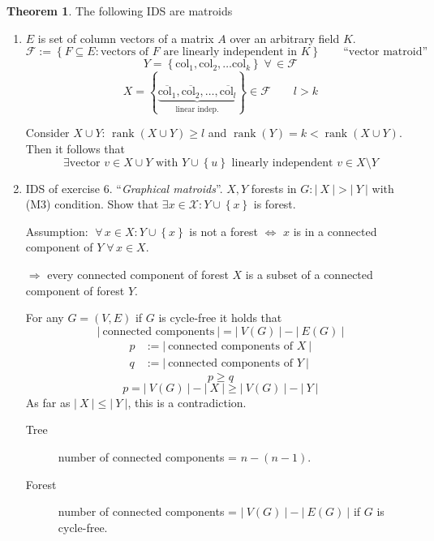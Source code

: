 \documentclass[a4paper]{article}
\theoremstyle{definition}
\newtheorem{theorem}{Theorem}
\newcommand{\card}[1]{\left|\:\!#1\:\!\right|}
\newcommand{\set}[1]{\left\{#1\right\}}
\newcommand{\fall}{\;\forall\,}
\DeclareMathOperator{\rank}{rank}
\begin{document}
\begin{theorem}
  \label{proposition-8.1}
  The following IDS are matroids
  \begin{enumerate}
    \item $E$ is set of column vectors of a matrix $A$ over an arbitrary field $K$.
      \[
        \mathcal{F} := \set{F \subseteq E: \text{vectors of } F \text{ are linearly independent in } K}
            \qquad \text{``vector matroid''}
      \] \[
        Y = \set{\text{col}_1, \text{col}_2, \ldots \text{col}_k} \fall \in \mathcal{F}
      \] \[
        X = \set{
          \underbrace{\overline{\text{col}_1}, \overline{\text{col}_2}, \ldots, \overline{\text{col}_l}}_{\text{linear indep.}}
        } \in \mathcal{F} \qquad l > k
      \]

      Consider $X \cup Y$: $\rank(X \cup Y) \geq l$ and $\rank(Y) = k < \rank(X \cup Y)$.
      Then it follows that
      \[
        \exists \text{vector } v \in X \cup Y \text{ with } Y \cup \set{u}
        \text{ linearly independent } v \in X \setminus Y
      \]

    \item IDS of exercise $6$. ``\emph{Graphical matroids}''. 
      $X, Y$ forests in $G: \card{X} > \card{Y}$ with (M3) condition. Show that $\exists x \in \mathcal{X}: Y \cup \set{x}$ is forest.

      Assumption: $\fall x \in X: Y \cup \set{x}$ is not a forest $\Leftrightarrow$ $x$ is in a connected component of $Y \fall x \in X$.

      $\Rightarrow$ every connected component of forest $X$ is a subset of a connected component of forest $Y$.


      For any $G = (V, E)$ if $G$ is cycle-free it holds that
      \[ \card{\text{connected components}} = \card{V(G)} - \card{E(G)}  \]
      \begin{align*}
        p &:= \card{\text{connected components of } X} \\
        q &:= \card{\text{connected components of } Y}
      \end{align*}
      \[
        p \geq q
      \] \[
        p = \card{V(G)} - \card{X} \geq \card{V(G)} - \card{Y}
      \]
      As far as $\card{X} \leq \card{Y}$, this is a contradiction.

      \begin{framed}
        \begin{description}
          \item[Tree] number of connected components = $n - (n-1)$. \\
          \item[Forest] number of connected components = $\card{V(G)} - \card{E(G)}$ if $G$ is cycle-free.
        \end{description}
      \end{framed}


\end{enumerate}
\end{theorem}
\end{document}
